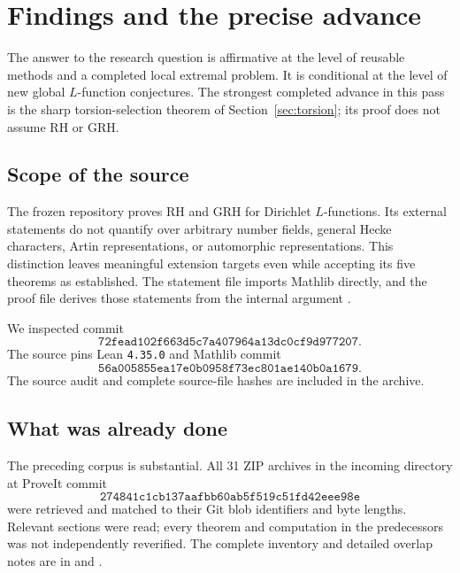 \section{Findings and the precise advance}
\label{sec:assessment}

The answer to the research question is affirmative at the level of reusable methods and a completed local extremal problem. It is conditional at the level of new global \(L\)-function conjectures. The strongest completed advance in this pass is the sharp torsion-selection theorem of Section~\ref{sec:torsion}; its proof does not assume RH or GRH.

\subsection{Scope of the source}
The frozen repository proves RH and GRH for Dirichlet \(L\)-functions. Its external statements do not quantify over arbitrary number fields, general Hecke characters, Artin representations, or automorphic representations. This distinction leaves meaningful extension targets even while accepting its five theorems as established. The statement file imports Mathlib directly, and the proof file derives those statements from the internal argument \cite{grh}.

We inspected commit
\[
\texttt{72fead102f663d5c7a407964a13dc0cf9d977207}.
\]
The source pins Lean \texttt{4.35.0} and Mathlib commit
\[
\texttt{56a005855ea17e0b0958f73ec801ae140b0a1679}.
\]
The source audit and complete source-file hashes are included in the archive.

\subsection{What was already done}
The preceding corpus is substantial. All 31 ZIP archives in the incoming directory at ProveIt commit
\[
\texttt{274841c1cb137aafbb60ab5f519c51fd42eee98e}
\]
were retrieved and matched to their Git blob identifiers and byte lengths. Relevant sections were read; every theorem and computation in the predecessors was not independently reverified. The complete inventory and detailed overlap notes are in  and .

